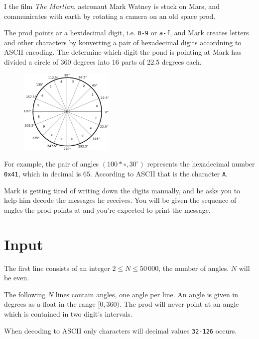 
I the film \emph{The Martian}, astronaut Mark Watney is stuck on Mars, and communicates with earth by rotating a camera on an old space prod.

The prod points ar a hexidecimal digit, i.e. \texttt{0-9} or \texttt{a-f}, and Mark creates letters and other characters by konverting a pair
of hexadecimal digits accordning to ASCII encoding. The determine which digit the pond is pointing at Mark has divided a circle of 360 degrees into 16 parts of 22.5 degrees each.

\begin{figure}[h!]
  \begin{center}
    \includegraphics[width=0.4\textwidth]{angles.eps}
  \end{center}
\end{figure}

For example, the pair of angles $(100*{\circ}, 30^{\circ})$ represents the hexadecimal number \texttt{0x41}, which in decimal is $65$.
According to ASCII that is the character \texttt{A}.

Mark is getting tired of writing down the digits manually, and he asks you to help him decode the messages he receives. You will be given the sequence of angles the prod points at and you're expected to print the message.

\section*{Input}
The first line consists of an integer $2 \le N \le 50\,000$, the number of angles. $N$ will be even.

The following $N$ lines contain angles, one angle per line. An angle is given in degrees as a float in the range $[0, 360)$.
The prod will never point at an angle which is contained in two digit's intervals.

When decoding to ASCII only characters will decimal values \texttt{32-126} occurs.

